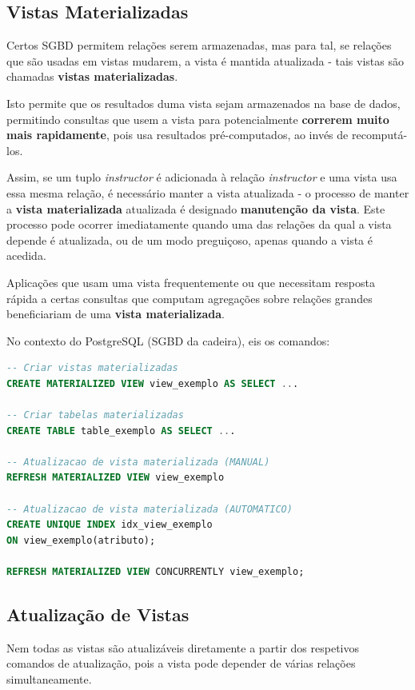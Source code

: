 \documentclass[oneside]{book}
\theoremstyle{definition}
\begin{document}
\subsection{Vistas Materializadas}
Certos SGBD permitem relações serem armazenadas, mas para tal, se relações que são usadas em vistas mudarem, a vista é mantida atualizada - tais vistas são chamadas \textbf{vistas materializadas}.

Isto permite que os resultados duma vista sejam armazenados na base de dados, permitindo consultas que usem a vista para potencialmente \textbf{correrem muito mais rapidamente}, pois usa resultados pré-computados, ao invés de recomputá-los.

Assim, se um tuplo \textit{instructor} é adicionada à relação \textit{instructor} e uma vista usa essa mesma relação, é necessário manter a vista atualizada - o processo de manter a \textbf{vista materializada} atualizada é designado \textbf{manutenção da vista}. Este processo pode ocorrer imediatamente quando uma das relações da qual a vista depende é atualizada, ou de um modo preguiçoso, apenas quando a vista é acedida. 

Aplicações que usam uma vista frequentemente ou que necessitam resposta rápida a certas consultas que computam agregações sobre relações grandes beneficiariam de uma \textbf{vista materializada}.

No contexto do PostgreSQL (SGBD da cadeira), eis os comandos:
\begin{lstlisting}[language=SQL, morekeywords={REFERENCES, REFRESH, MATERIALIZED, CONCURRENTLY}, framesep=8pt, xleftmargin=40pt, framexleftmargin=40pt, frame=tb, framerule=0pt]
-- Criar vistas materializadas
CREATE MATERIALIZED VIEW view_exemplo AS SELECT ...

-- Criar tabelas materializadas
CREATE TABLE table_exemplo AS SELECT ...

-- Atualizacao de vista materializada (MANUAL)
REFRESH MATERIALIZED VIEW view_exemplo

-- Atualizacao de vista materializada (AUTOMATICO)
CREATE UNIQUE INDEX idx_view_exemplo
ON view_exemplo(atributo);

REFRESH MATERIALIZED VIEW CONCURRENTLY view_exemplo;
\end{lstlisting}

\subsection{Atualização de Vistas}
Nem todas as vistas são atualizáveis diretamente a partir dos respetivos comandos de atualização, pois a vista pode depender de várias relações simultaneamente.
\end{document}
